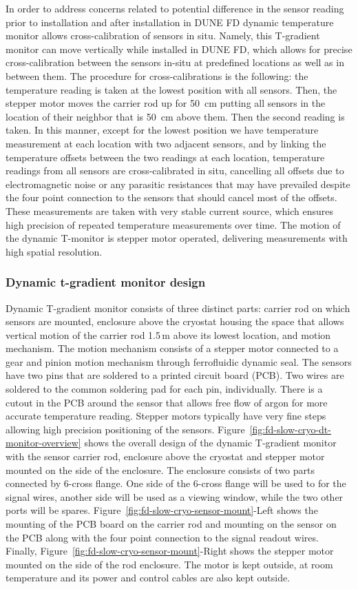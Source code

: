  In order to address concerns related to potential difference in the sensor reading prior to installation and after installation in DUNE FD dynamic temperature monitor allows cross-calibration of sensors in situ. Namely, this T-gradient monitor  can move vertically while installed in DUNE FD, which allows for precise cross-calibration between the sensors in-situ at predefined locations as well as in between them. The procedure for cross-calibrations is the following: the temperature reading is taken at the lowest position with all sensors. Then, the stepper motor moves the carrier rod up for \SI{50}{cm} putting all sensors in the location of their neighbor that is \SI{50}{cm} above them. Then the second reading is taken. In this manner, except for the lowest position we have temperature measurement at each location with two adjacent sensors, and by linking the temperature offsets between the two readings at each location, temperature readings from all sensors are cross-calibrated in situ, cancelling all offsets due to electromagnetic noise or any parasitic resistances that may have prevailed despite the four point connection to the sensors that should cancel most of the offsets. These measurements are taken with very stable current source, which ensures high precision of repeated temperature measurements over time. The motion of the dynamic T-monitor is stepper motor operated, delivering measurements with high spatial resolution. 

\subsubsection{Dynamic t-gradient monitor design}
Dynamic T-gradient monitor consists of three distinct parts: carrier rod on which sensors are mounted, enclosure above the cryostat housing the space that allows vertical motion of the carrier rod 1.5\,m above its lowest location, and motion mechanism. The motion mechanism consists of a stepper motor connected to a gear and pinion motion mechanism through ferrofluidic dynamic seal. The sensors have two pins that are soldered to a printed circuit board (PCB). Two wires are soldered to the common soldering pad for each pin, individually.   There is a cutout in the PCB around the sensor that allows free flow of argon for more accurate temperature reading.  Stepper motors typically have very fine steps allowing high precision positioning of the sensors.  Figure~\ref{fig:fd-slow-cryo-dt-monitor-overview} shows the overall design of the dynamic T-gradient monitor with the sensor carrier rod, enclosure above the cryostat and stepper motor mounted on the side of the enclosure. The enclosure consists of two parts connected by 6-cross flange. One side of the 6-cross flange will be used to for the signal wires, another side will be used as a viewing window, while the two other ports will be spares. Figure~\ref{fig:fd-slow-cryo-sensor-mount}-Left shows the mounting of the PCB board on the carrier rod and mounting on the sensor on the PCB along with the four point connection to the signal readout wires. Finally, Figure~\ref{fig:fd-slow-cryo-sensor-mount}-Right shows the stepper motor mounted on the side of the rod enclosure. The motor is kept outside, at room temperature and its power and control cables are also kept outside.

